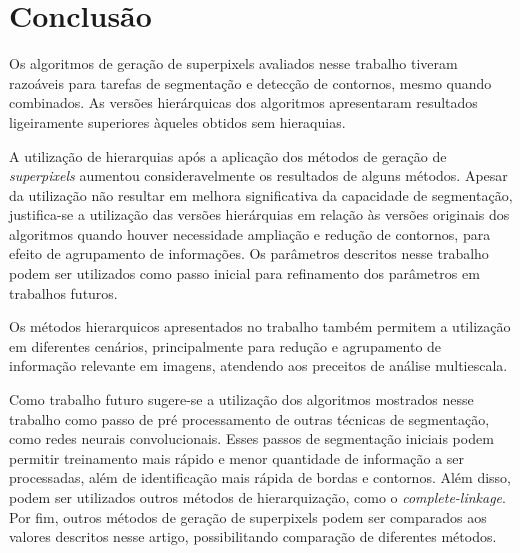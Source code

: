 \begin{document}


\section{Conclusão} \label{sec:conclusao}

Os algoritmos de geração de superpixels avaliados nesse trabalho tiveram razoáveis para tarefas de segmentação e detecção de contornos, mesmo quando combinados. As versões hierárquicas dos algoritmos apresentaram resultados ligeiramente superiores àqueles obtidos sem hieraquias.

A utilização de hierarquias após a aplicação dos métodos de geração de \textit{superpixels} aumentou consideravelmente os resultados de alguns métodos. Apesar da utilização não resultar em melhora significativa da capacidade de segmentação, justifica-se a utilização das versões hierárquias em relação às versões originais dos algoritmos quando houver necessidade ampliação e redução de contornos, para efeito de agrupamento de informações. Os parâmetros descritos nesse trabalho podem ser utilizados como passo inicial para refinamento dos parâmetros em trabalhos futuros.

Os métodos hierarquicos apresentados no trabalho também permitem a utilização em diferentes cenários, principalmente para redução e agrupamento de informação relevante em imagens, atendendo aos preceitos de análise multiescala. 

Como trabalho futuro sugere-se a utilização dos algoritmos mostrados nesse trabalho como passo de pré processamento de outras técnicas de segmentação, como redes neurais convolucionais. Esses passos de segmentação iniciais podem permitir treinamento mais rápido e menor quantidade de informação a ser processadas, além de identificação mais rápida de bordas e contornos. Além disso, podem ser utilizados outros métodos de hierarquização, como o \textit{complete-linkage}. Por fim, outros métodos de geração de superpixels podem ser comparados aos valores descritos nesse artigo, possibilitando comparação de diferentes métodos.




\end{document}
